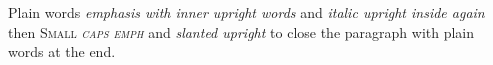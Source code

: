 \documentclass{article}
\begin{document}
Plain words \emph{emphasis with \emph{inner upright} words} and \textit{italic \emph{upright inside} again} then \textsc{Small \emph{caps emph}} and \textsl{slanted \emph{upright}} to close the paragraph with plain words at the end.
\end{document}

